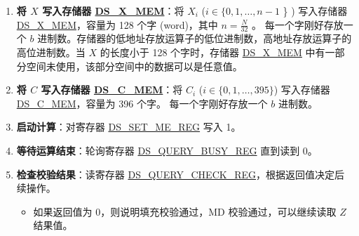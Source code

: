\documentclass[main\_\_CN.tex]{subfiles}
\begin{document}
\begin{enumerate}
    \item {\bfseries 将 \begin{math}X\end{math} 写入存储器 \hyperref[DSXMEM]{DS\_X\_MEM}}：将 \begin{math}X_{i}\end{math}
        (\begin{math}i \in \{ 0, 1, \dots, n-1 \end{math} \} )
        写入存储器 \hyperref[DSXMEM]{DS\_X\_MEM}，容量为 128 个字 (word)，其中 \begin{math} n = \frac{N}{32} \end{math} 。
        每一个字刚好存放一个 \begin{math}b\end{math} 进制数。存储器的低地址存放运算子的低位进制数，高地址存放运算子的高位进制数。当 \begin{math}X\end{math} 的长度小于 128 个字时，存储器 \hyperref[DSXMEM]{DS\_X\_MEM} 中有一部分空间未使用，该部分空间中的数据可以是任意值。

    \item {\bfseries 将 \begin{math}C\end{math} 写入存储器 \hyperref[DSCMEM]{DS\_C\_MEM}}：将
        \begin{math}C_{i}\end{math}
        (\begin{math}i \in \{ 0, 1, \dots, 395 \} \end{math})
        写入存储器 \hyperref[DSCMEM]{DS\_C\_MEM}，容量为 396 个字。
        每一个字刚好存放一个 \begin{math}b\end{math} 进制数。


    \item {\bfseries 启动计算}：对寄存器 \hyperref[regdesc:DSSETMEREG]{DS\_SET\_ME\_REG} 写入 1。

    \item {\bfseries 等待运算结束}：轮询寄存器 \hyperref[regdesc:DSQUERYBUSYREG]{DS\_QUERY\_BUSY\_REG} 直到读到 0。

    \item {\bfseries 检查校验结果}：读寄存器 \hyperref[regdesc:DSQUERYCHECKREG]{DS\_QUERY\_CHECK\_REG}，根据返回值决定后续操作。

    \begin{itemize}

        \item 如果返回值为 0，则说明填充校验通过，MD 校验通过，可以继续读取 \begin{math}Z\end{math} 结果值。


\end{itemize}
\end{enumerate}
\end{document}
